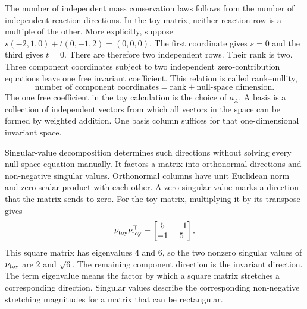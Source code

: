 The number of independent mass conservation laws follows from the number of independent reaction directions. In the toy matrix, neither reaction row is a multiple of the other. More explicitly, suppose $s(-2,1,0)+t(0,-1,2)=(0,0,0)$. The first coordinate gives $s=0$ and the third gives $t=0$. There are therefore two independent rows. Their rank is two. Three component coordinates subject to two independent zero-contribution equations leave one free invariant coefficient. This relation is called rank--nullity,
\[
\text{number of component coordinates}
=\text{rank}+\text{null-space dimension}.
\]
The one free coefficient in the toy calculation is the choice of $a_A$. A basis is a collection of independent vectors from which all vectors in the space can be formed by weighted addition. One basis column suffices for that one-dimensional invariant space.

Singular-value decomposition determines such directions without solving every null-space equation manually. It factors a matrix into orthonormal directions and non-negative singular values. Orthonormal columns have unit Euclidean norm and zero scalar product with each other. A zero singular value marks a direction that the matrix sends to zero. For the toy matrix, multiplying it by its transpose gives
\[
\nu_{\rm toy}\nu_{\rm toy}^\top
=\begin{bmatrix}5&-1\\-1&5\end{bmatrix}.
\]
This square matrix has eigenvalues 4 and 6, so the two nonzero singular values of $\nu_{\rm toy}$ are 2 and $\sqrt6$. The remaining component direction is the invariant direction. The term eigenvalue means the factor by which a square matrix stretches a corresponding direction. Singular values describe the corresponding non-negative stretching magnitudes for a matrix that can be rectangular.

